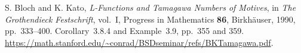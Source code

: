 S. Bloch and K. Kato, \emph{L-Functions and Tamagawa Numbers of Motives},
in \emph{The Grothendieck Festschrift}, vol.~I,
Progress in Mathematics \textbf{86}, Birkh\"auser, 1990, pp.~333--400.
Corollary~3.8.4 and Example~3.9, pp.~355 and 359.
\url{https://math.stanford.edu/~conrad/BSDseminar/refs/BKTamagawa.pdf}.
